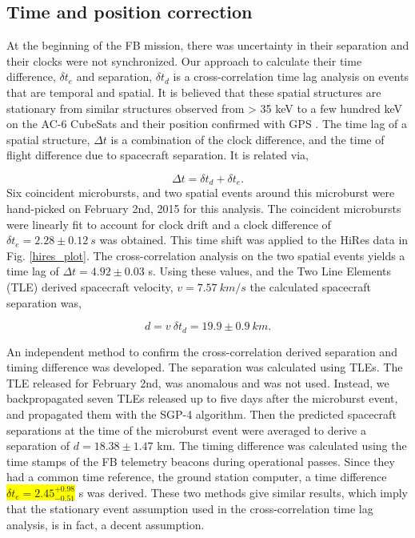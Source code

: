 \documentclass[draft,linenumbers]{agujournal}
\begin{document}
\subsection{Time and position correction} \label{corrections}
At the beginning of the FB mission, there was uncertainty in their separation and their clocks were not synchronized. Our approach to calculate their time difference, $\delta t_{e}$  and separation, $\delta t_{d}$ is a cross-correlation time lag analysis on events that are temporal and spatial. It is believed that these spatial structures are stationary from similar structures observed from > 35 keV to a few hundred keV on the AC-6 CubeSats and their position confirmed with GPS \citep{Blake16}. The time lag of a spatial structure, $\Delta t$ is a combination of the clock difference, and the time of flight difference due to spacecraft separation. It is related via,

\begin{equation}
\Delta t = \delta t_{d} + \delta t_{e}.
\end{equation} Six coincident microbursts, and two spatial events around this microburst were hand-picked on February 2nd, 2015 for this analysis. The coincident microbursts were linearly fit to account for clock drift and a clock difference of $\delta t_{e} = 2.28 \pm 0.12 \ s$ was obtained. This time shift was applied to the HiRes data in Fig. \ref{hires_plot}. The cross-correlation analysis on the two spatial events yields a time lag of $\Delta t = 4.92 \pm 0.03$ s. Using these values, and the Two Line Elements (TLE) derived spacecraft velocity, $v = 7.57 \ km/s$ the calculated spacecraft separation was,

\begin{equation}
d = v \ \delta t_{d} = 19.9 \pm 0.9 \ km.
\end{equation}

An independent method to confirm the cross-correlation derived separation and timing difference was developed. The separation was calculated using TLEs. The TLE released for February 2nd, was anomalous and was not used. Instead, we backpropagated seven TLEs released up to five days after the microburst event, and propagated them with the SGP-4 algorithm. Then the predicted spacecraft separations at the time of the microburst event were averaged to derive a separation of $d = 18.38 \pm 1.47$ km. The timing difference was calculated using the time stamps of the FB telemetry beacons during operational passes. Since they had a common time reference, the ground station computer, a time difference \colorbox{yellow}{$\delta t_{e}  = 2.45^{+ 0.98}_{-0.51}$} s was derived. These two methods give similar results, which imply that the stationary event assumption used in the cross-correlation time lag analysis, is in fact, a decent assumption.
\end{document}

